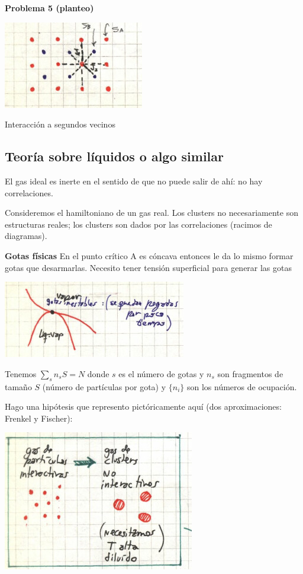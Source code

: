 \documentclass[10pt,oneside]{CBFT_book}
\begin{document}
\begin{ejemplo}{\bf Problema 5 (planteo)}

\includegraphics[scale=0.5]{images/1606337197.jpg}

Interacción a segundos vecinos
 
\end{ejemplo}

\subsection{Teoría sobre líquidos o algo similar}

El gas ideal es inerte en el sentido de que no puede salir de ahí: no hay correlaciones.

Consideremos el hamiltoniano de un gas real. Los clusters no necesariamente son estructuras reales;
los clusters son dados por las correlaciones (racimos de diagramas).

{\bf Gotas físicas} En el punto crítico A es cóncava entonces le da lo mismo formar gotas que desarmarlas.
Necesito tener tensión superficial para generar las gotas

\includegraphics[scale=0.5]{images/1606337186.jpg}

Tenemos $ \sum_s n_s S = N $ donde $s$ es el número de gotas y $n_s$ son fragmentos de tamaño $S$
(número de partículas por gota) y $\{ n_i \}$ son los números de ocupación.

Hago una hipótesis que represento pictóricamente aquí (dos aproximaciones: Frenkel y Fischer):

\includegraphics[scale=0.5]{images/1606337189.jpg}
\end{document}
